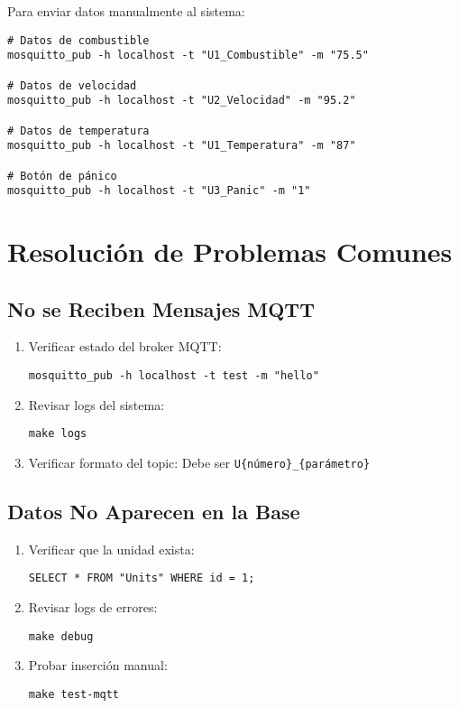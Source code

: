 Para enviar datos manualmente al sistema:

\begin{verbatim}
# Datos de combustible
mosquitto_pub -h localhost -t "U1_Combustible" -m "75.5"

# Datos de velocidad
mosquitto_pub -h localhost -t "U2_Velocidad" -m "95.2"

# Datos de temperatura
mosquitto_pub -h localhost -t "U1_Temperatura" -m "87"

# Botón de pánico
mosquitto_pub -h localhost -t "U3_Panic" -m "1"
\end{verbatim}

\section{Resolución de Problemas Comunes}

\subsection{No se Reciben Mensajes MQTT}

\begin{enumerate}[noitemsep]
    \item Verificar estado del broker MQTT:
    \begin{verbatim}
mosquitto_pub -h localhost -t test -m "hello"
    \end{verbatim}
    
    \item Revisar logs del sistema:
    \begin{verbatim}
make logs
    \end{verbatim}
    
    \item Verificar formato del topic:
    Debe ser \texttt{U\{número\}\_\{parámetro\}}
\end{enumerate}

\subsection{Datos No Aparecen en la Base}

\begin{enumerate}[noitemsep]
    \item Verificar que la unidad exista:
    \begin{verbatim}
SELECT * FROM "Units" WHERE id = 1;
    \end{verbatim}
    
    \item Revisar logs de errores:
    \begin{verbatim}
make debug
    \end{verbatim}
    
    \item Probar inserción manual:
    \begin{verbatim}
make test-mqtt
    \end{verbatim}
\end{enumerate}
